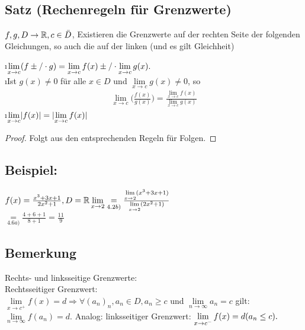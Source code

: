 \subsection{Satz (Rechenregeln für Grenzwerte)}
$f,g, D \rightarrow \mathbb{R}, c \in \bar{D}$, Existieren die Grenzwerte auf der rechten Seite der folgenden Gleichungen, so auch die auf der linken (und es gilt Gleichheit)\\
\begin{enumerate}[a)]
\i$ \lim\limits_{x \rightarrow c}(f \pm/\cdot g) = \lim\limits_{x \rightarrow c} f(x) \pm/\cdot \lim\limits_{x \rightarrow c} g(x).$\\
\i Ist $g(x) \not = 0$ für alle $x \in D$ und $\lim\limits_{x \rightarrow c} g(x) \not = 0$, so\\
\begin{align*}
\lim\limits_{x \rightarrow c}\biggl(\frac{f(x)}{g(x)}\biggr) = \frac{\lim\limits_{x \rightarrow c }f(x)}{\lim\limits_{x \rightarrow c} g(x)}
\end{align*}
\i $\lim\limits_{x \rightarrow c} \lvert f(x) \rvert = \lvert \lim\limits_{x \rightarrow c} f(x) \rvert$\\
\begin{proof}
Folgt aus den entsprechenden Regeln für Folgen.
\end{proof}
\end{enumerate}
\subsection[Beispiel]{Beispiel:}
$f(x) = \frac{x^3 + 3x +1}{2x^2 + 1}, D = \mathbb{R}\\
\lim\limits_{x \rightarrow 2} \underset{4.2b)}{=} \frac{\lim\limits_{x \rightarrow 2}(x^3 + 3x +1) }{\lim\limits_{x \rightarrow 2}(2x^2 + 1)}$\\
$\underset{4.6a)}{=} \frac{4+6+1}{8+1} =\frac{11}{9}$\\
\subsection{Bemerkung}
Rechts- und linksseitige Grenzwerte:\\
Rechtsseitiger Grenzwert:\\
$\lim\limits_{x \rightarrow c^+} f(x) = d \Rightarrow \forall (a_n)_n , a_n \in D, a_n \geq c$ und $\lim\limits_{n \rightarrow \infty} a_n = c $ gilt: $\lim\limits_{n \rightarrow \infty} f(a_n) =d.$
Analog: linksseitiger Grenzwert: $\lim\limits_{x \rightarrow c^-} f(x) = d\\
(a_n \leq c).$\\
